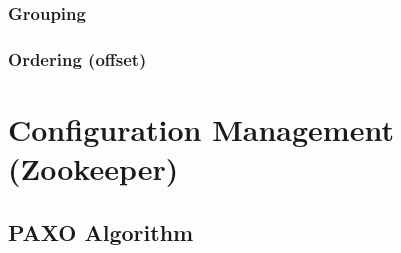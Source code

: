 
\subsubsection{Grouping}

\subsubsection{Ordering (offset)}

\section{Configuration Management (Zookeeper)}
\subsection{PAXO Algorithm}
